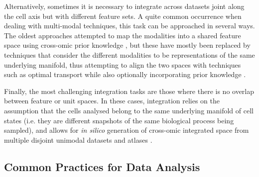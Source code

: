 Alternatively, sometimes it is necessary to integrate across datasets joint along the cell axis but with different feature sets. A quite common occurrence when dealing with multi-modal techniques, this task can be approached in several ways. The oldest approaches attempted to map the modalities into a shared feature space using cross-omic prior knowledge \cite{chen_assessment_2019}, but these have mostly been replaced by techniques that consider the different modalities to be representations of the same underlying manifold, thus attempting to align the two spaces with techniques such as optimal transport while also optionally incorporating prior knowledge \cite{cao_unsupervised_2020, cao_multi-omics_2022}.

Finally, the most challenging integration tasks are those where there is no overlap between feature or unit spaces. In these cases, integration relies on the assumption that the cells analysed belong to the same underlying manifold of cell states (i.e. they are different snapshots of the same biological process being sampled), and allows for \emph{in silico} generation of cross-omic integrated space from multiple disjoint unimodal datasets and atlases \cite{amodio_magan:_2018,lotfollahi_mapping_2022,cao_multi-omics_2022}.


\subsection{Common Practices for Data Analysis}





